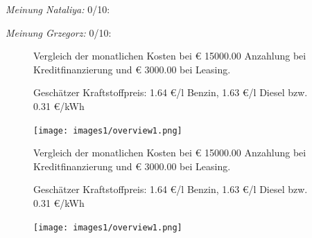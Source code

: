 \documentclass[landscape, DIV=99, 14pt]{scrartcl}
\begin{document}
\begin{small}
\emph{Meinung Nataliya:} 0/10: 
        
\emph{Meinung Grzegorz:} 0/10: 
\end{small}

\pagebreak



\pagebreak

\onecolumn
\begin{figure}
\centering
Vergleich der monatlichen Kosten bei \euro{} 15000.00 Anzahlung bei Kreditfinanzierung und \euro{} 3000.00 bei Leasing.

Gesch\"atzer Kraftstoffpreis: 1.64 \euro{}/l Benzin, 1.63 \euro{}/l Diesel bzw. 0.31 \euro{}/kWh


\vspace{1em}
\texttt{[image: images1/overview1.png]}
\end{figure}
\vfill 



\pagebreak

\onecolumn
\begin{figure}
\centering
Vergleich der monatlichen Kosten bei \euro{} 15000.00 Anzahlung bei Kreditfinanzierung und \euro{} 3000.00 bei Leasing.

Gesch\"atzer Kraftstoffpreis: 1.64 \euro{}/l Benzin, 1.63 \euro{}/l Diesel bzw. 0.31 \euro{}/kWh


\vspace{1em}
\texttt{[image: images1/overview1.png]}
\end{figure}
\vfill 
\end{document}
